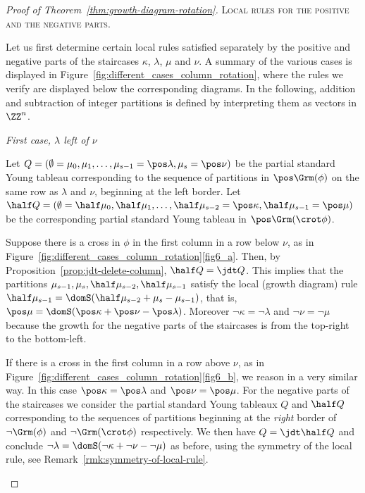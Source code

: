 \begin{proof}[Proof of Theorem~\ref{thm:growth-diagram-rotation}]
 \textsc{Local rules for the positive and the negative parts.} 

 Let us first determine certain local rules satisfied separately by
 the positive and negative parts of the staircases $\kappa$,
 $\lambda$, $\mu$ and $\nu$. A summary of the various cases is
 displayed in Figure~\ref{fig:different_cases_column_rotation},
 where the rules we verify are displayed below the corresponding
 diagrams. In the following, addition and subtraction of integer
 partitions is defined by interpreting them as vectors in $\ZZ^n$.

\begin{enonce*}[remark]{\emph{First case, $\lambda$ left of $\nu$}} \ 

 Let
 $Q=(\emptyset=\mu_0, \mu_1, \ldots, \mu_{s-1} = \pos\lambda, \mu_s
 = \pos\nu)$
 be the partial standard Young tableau corresponding to the sequence
 of partitions in $\pos\Grm(\phi)$ on the same row as $\lambda$ and
 $\nu$, beginning at the left border. Let
 $\half Q = (\emptyset=\half\mu_0, \half\mu_1, \ldots,
 \half\mu_{s-2} = \pos\kappa, \half\mu_{s-1} = \pos\mu)$
 be the corresponding partial standard Young tableau in
 $\pos\Grm(\crot\phi)$.

 Suppose there is a cross in $\phi$ in the first column in a row
 below $\nu$, as in
 Figure~\ref{fig:different_cases_column_rotation}\ref{fig6_a}. Then, by
 Proposition~\ref{prop:jdt-delete-column}, $\half Q = \jdt Q$. This
 implies that the partitions
 $\mu_{s-1},\mu_s,\half\mu_{s-2},\half\mu_{s-1}$ satisfy the local
 (growth diagram) rule
 $\half\mu_{s-1} = \domS(\half\mu_{s-2}+\mu_s-\mu_{s-1})$, that is,
 $\pos\mu = \domS(\pos\kappa+\pos\nu-\pos\lambda)$. Moreover
 $\neg\kappa = \neg\lambda$ and $\neg\nu=\neg\mu$ because the growth
 for the negative parts of the staircases is from the top-right to
 the bottom-left.

 If there is a cross in the first column in a row above $\nu$, as in
 Figure~\ref{fig:different_cases_column_rotation}\ref{fig6_b}, we reason in a
 very similar way. In this case $\pos\kappa = \pos\lambda$ and
 $\pos\nu=\pos\mu$. For the negative parts of the staircases we
 consider the partial standard Young tableaux $Q$ and $\half Q$
 corresponding to the sequences of partitions beginning at the
 \emph{right} border of $\neg\Grm(\phi)$ and $\neg\Grm(\crot\phi)$
 respectively. We then have $Q = \jdt \half Q$ and conclude
 $\neg\lambda = \domS(\neg\kappa+\neg\nu-\neg\mu)$ as before, using
 the symmetry of the local rule, see
 Remark~\ref{rmk:symmetry-of-local-rule}.
\end{enonce*}


\end{proof}
